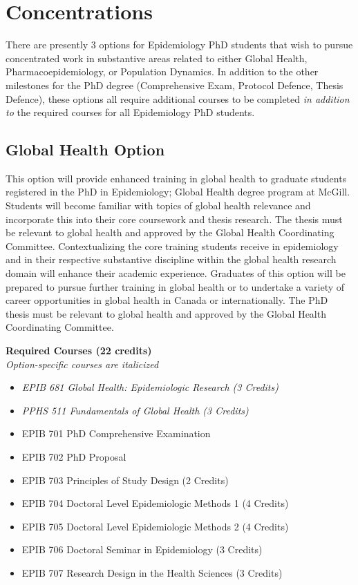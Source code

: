 \documentclass[
]{book}
\providecommand{\tightlist}{%
  \setlength{\itemsep}{0pt}\setlength{\parskip}{0pt}}
\begin{document}
\hypertarget{concentrations}{%
\chapter{Concentrations}\label{concentrations}}

There are presently 3 options for Epidemiology PhD students that wish to pursue concentrated work in substantive areas related to either Global Health, Pharmacoepidemiology, or Population Dynamics. In addition to the other milestones for the PhD degree (Comprehensive Exam, Protocol Defence, Thesis Defence), these options all require additional courses to be completed \emph{in addition to} the required courses for all Epidemiology PhD students.

\hypertarget{global-health-option}{%
\section{Global Health Option}\label{global-health-option}}

This option will provide enhanced training in global health to graduate students registered in the PhD in Epidemiology; Global Health degree program at McGill. Students will become familiar with topics of global health relevance and incorporate this into their core coursework and thesis research. The thesis must be relevant to global health and approved by the Global Health Coordinating Committee. Contextualizing the core training students receive in epidemiology and in their respective substantive discipline within the global health research domain will enhance their academic experience. Graduates of this option will be prepared to pursue further training in global health or to undertake a variety of career opportunities in global health in Canada or internationally. The PhD thesis must be relevant to global health and approved by the Global Health Coordinating Committee.

\textbf{Required Courses (22 credits)}\\
\emph{Option-specific courses are italicized}

\begin{itemize}
\tightlist
\item
  \emph{EPIB 681 Global Health: Epidemiologic Research (3 Credits)}
\item
  \emph{PPHS 511 Fundamentals of Global Health (3 Credits)}
\item
  EPIB 701 PhD Comprehensive Examination
\item
  EPIB 702 PhD Proposal
\item
  EPIB 703 Principles of Study Design (2 Credits)
\item
  EPIB 704 Doctoral Level Epidemiologic Methods 1 (4 Credits)
\item
  EPIB 705 Doctoral Level Epidemiologic Methods 2 (4 Credits)
\item
  EPIB 706 Doctoral Seminar in Epidemiology (3 Credits)
\item
  EPIB 707 Research Design in the Health Sciences (3 Credits)
\end{itemize}
\end{document}
